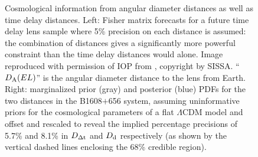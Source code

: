\begin{figure}[!t]
\begin{minipage}{0.48\linewidth}
\end{minipage}
\caption{Cosmological information from angular diameter distances
as well as time delay distances. Left: Fisher matrix
forecasts for a future time delay lens sample where 5\% precision on
each distance is assumed: the combination of distances gives a
significantly more powerful constraint than the time delay distances
would alone. Image reproduced with permission of IOP from \citet{JeeEtal2016}, copyright by SISSA.  ``$D_{\rm A}(EL)$'' is
the angular diameter distance to the lens from Earth. Right: marginalized
prior (gray) and posterior (blue) PDFs for the two
distances in the B1608$+$656 system, assuming uninformative priors for the
cosmological parameters of a flat $\Lambda$CDM model and offset and
rescaled to reveal the implied percentage precisions of 5.7\% and 8.1\%
in $D_{\Delta{\rm t}}$ and $D_{\rm d}$ respectively (as shown by the vertical dashed lines
enclosing the 68\% credible region). }
\label{fig:DdDdt}
\end{figure}


%
%



